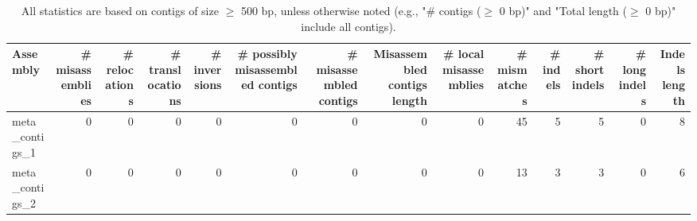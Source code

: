 \documentclass[12pt,a4paper]{article}
\begin{document}
\begin{table}[ht]
\begin{center}
\caption{All statistics are based on contigs of size $\geq$ 500 bp, unless otherwise noted (e.g., "\# contigs ($\geq$ 0 bp)" and "Total length ($\geq$ 0 bp)" include all contigs).}
\begin{tabular}{|l*{13}{|r}|}
\hline
Assembly & \# misassemblies &     \# relocations &     \# translocations &     \# inversions & \# possibly misassembled contigs & \# misassembled contigs & Misassembled contigs length & \# local misassemblies & \# mismatches & \# indels &     \# short indels &     \# long indels & Indels length \\ \hline
meta\_contigs\_1 & 0 & 0 & 0 & 0 & 0 & 0 & 0 & 0 & 45 & 5 & 5 & 0 & 8 \\ \hline
meta\_contigs\_2 & 0 & 0 & 0 & 0 & 0 & 0 & 0 & 0 & 13 & 3 & 3 & 0 & 6 \\ \hline
\end{tabular}
\end{center}
\end{table}
\end{document}

